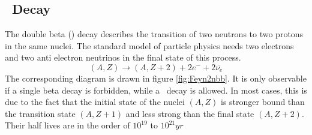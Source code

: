 \documentclass[encoding=utf8,british]{tumphthesis}
\begin{document}



\subsection{\onbb\ Decay}
\label{sec:0nubetabeta}

The double beta (\twonu) decay describes the transition of two neutrons to two protons in the same nuclei.
The standard model of particle physics needs two electrons and two anti electron neutrinos in the final state of this process.
\begin{equation}
(A,Z)\rightarrow (A,Z+2) + 2e^- + 2\bar{\nu_e}
\end{equation} 
The corresponding diagram is drawn in figure \ref{fig:Feyn2nbb}.
It is only observable if a single beta decay is forbidden, while a \twonu\ decay is allowed.
In most cases, this is due to the fact that the initial state of the nuclei $(A,Z)$ is stronger bound than the transition state $(A,Z+1)$ and less strong than the final state $(A,Z+2)$.
Their half lives are in the order of $10^{19}$ to $10^{21} \unit{yr}$
\\
\end{document}
